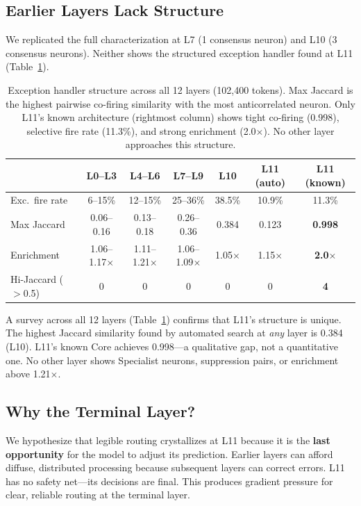 \documentclass{article}
\begin{document}
\subsection{Earlier Layers Lack Structure}

We replicated the full characterization at L7 (1 consensus neuron) and L10
(3 consensus neurons).
Neither shows the structured exception handler found at L11
(Table~\ref{tab:cross_layer}).

\begin{table}[t]
\centering
\caption{Exception handler structure across all 12 layers (102,400 tokens).
Max Jaccard is the highest pairwise co-firing similarity with the most
anticorrelated neuron. Only L11's known architecture (rightmost column)
shows tight co-firing (0.998), selective fire rate (11.3\%), and strong
enrichment (2.0$\times$). No other layer approaches this structure.}
\label{tab:cross_layer}
\small
\begin{tabular}{@{}lcccccc@{}}
\toprule
 & L0--L3 & L4--L6 & L7--L9 & L10 & L11 (auto) & L11 (known) \\
\midrule
Exc.\ fire rate & 6--15\% & 12--15\% & 25--36\% & 38.5\% & 10.9\% & 11.3\% \\
Max Jaccard     & 0.06--0.16 & 0.13--0.18 & 0.26--0.36 & 0.384 & 0.123 & \textbf{0.998} \\
Enrichment      & 1.06--1.17$\times$ & 1.11--1.21$\times$ & 1.06--1.09$\times$ & 1.05$\times$ & 1.15$\times$ & \textbf{2.0$\times$} \\
Hi-Jaccard ($>$0.5) & 0 & 0 & 0 & 0 & 0 & \textbf{4} \\
\bottomrule
\end{tabular}
\end{table}

A survey across all 12 layers (Table~\ref{tab:cross_layer}) confirms that
L11's structure is unique.
The highest Jaccard similarity found by automated search at \emph{any} layer
is 0.384 (L10).
L11's known Core achieves 0.998---a qualitative gap, not a quantitative one.
No other layer shows Specialist neurons, suppression pairs, or enrichment
above 1.21$\times$.

\subsection{Why the Terminal Layer?}

We hypothesize that legible routing crystallizes at L11 because it is the
\textbf{last opportunity} for the model to adjust its prediction.
Earlier layers can afford diffuse, distributed processing because subsequent
layers can correct errors.
L11 has no safety net---its decisions are final.
This produces gradient pressure for clear, reliable routing at the terminal
layer.
\end{document}

